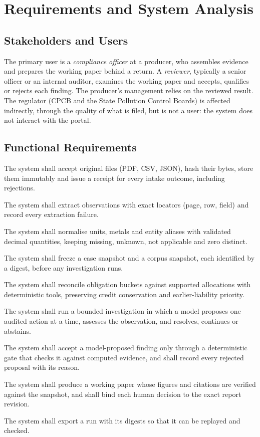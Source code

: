 \chapter{Requirements and System Analysis}

\section{Stakeholders and Users}
The primary user is a \emph{compliance officer} at a producer, who assembles evidence and prepares
the working paper behind a return. A \emph{reviewer}, typically a senior officer or an internal
auditor, examines the working paper and accepts, qualifies or rejects each finding. The producer's
management relies on the reviewed result. The regulator (CPCB and the State Pollution Control
Boards) is affected indirectly, through the quality of what is filed, but is not a user: the
system does not interact with the portal.

\section{Functional Requirements}
\begin{description}[itemsep=1pt,font=\normalfont\bfseries]
\item[FR1] The system shall accept original files (PDF, CSV, JSON), hash their bytes, store them
immutably and issue a receipt for every intake outcome, including rejections.
\item[FR2] The system shall extract observations with exact locators (page, row, field) and record
every extraction failure.
\item[FR3] The system shall normalise units, metals and entity aliases with validated decimal
quantities, keeping missing, unknown, not applicable and zero distinct.
\item[FR4] The system shall freeze a case snapshot and a corpus snapshot, each identified by a
digest, before any investigation runs.
\item[FR5] The system shall reconcile obligation buckets against supported allocations with
deterministic tools, preserving credit conservation and earlier-liability priority.
\item[FR6] The system shall run a bounded investigation in which a model proposes one audited
action at a time, assesses the observation, and resolves, continues or abstains.
\item[FR7] The system shall accept a model-proposed finding only through a deterministic gate that
checks it against computed evidence, and shall record every rejected proposal with its reason.
\item[FR8] The system shall produce a working paper whose figures and citations are verified
against the snapshot, and shall bind each human decision to the exact report revision.
\item[FR9] The system shall export a run with its digests so that it can be replayed and checked.
\end{description}

